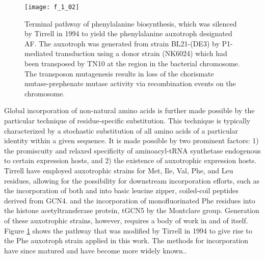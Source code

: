 \begin{refsection}
\begin{figure}[h!] \centering \texttt{[image: f\_1\_02]}
    \caption[Terminal pathway
        of phenylalanine biosynthesis, which was silenced by
        Tirrell  in 1994 to yield the phenylalanine auxotroph
        designated AF. The auxotroph was generated from
         strain BL21-(DE3) by P1-mediated transduction using a
        donor strain (NK6024) which had been transposed by TN10 at the
         region in the bacterial chromosome.  The transposon
        mutagenesis results in loss of the chorismate mutage-prephenate mutase
        activity via recombination events on the
chromosome.]{Terminal pathway
        of phenylalanine biosynthesis,\cite{Im1971} which was silenced by
        Tirrell  in 1994 to yield the phenylalanine auxotroph
        designated AF.\cite{Yoshikawa1994} The auxotroph was generated from
         strain BL21-(DE3) by P1-mediated transduction using a
        donor strain (NK6024) which had been transposed by TN10 at the
         region in the bacterial chromosome.  The transposon
        mutagenesis results in loss of the chorismate mutase-prephenate mutase
        activity via recombination events on the
chromosome.}\label{fig:chorismate_pathway} \end{figure}
Global incorporation of non-natural amino acids is further made possible by the
particular technique of residue-specific substitution. This technique is
typically characterized by a stochastic substitution of all amino acids of a
particular identity within a given sequence. It is made possible by two
prominent factors: 1) the promiscuity and relaxed specificity of aminoacyl-tRNA
synthetase endogenous to certain expression hosts,\cite{Yoder2002} and 2) the
existence of auxotrophic expression hosts.\cite{Link2003,Link2005} Tirrell 
have employed  auxotrophic strains for Met,\cite{Kiick2002}
Ile,\cite{Wang2003a}
Val,\cite{Wang2004}
Phe,\cite{Yoshikawa1994} 
and Leu residues,\cite{Tang2001a}
allowing for the possibility for downstream incorporation efforts,
such as the incorporation of both  and
 into basic leucine zipper, coiled-coil
peptides derived from GCN4.\cite{Son2006} and the incorporation of
monofluorinated Phe residues into the histone acetyltransferase protein,
tGCN5 by the Montclare group.\cite{Voloshchuk2009} 
Generation of these auxotrophic strains, however,
requires a body of work in and of itself.\cite{Yoshikawa1994,Son2006} Figure
\ref{fig:chorismate_pathway} shows the pathway that was modified by Tirrell
 in 1994 to give rise to the Phe auxotroph strain applied in this
work. The methods for incorporation have since matured and have become more
widely known.\cite{Hammill2007}.


\end{refsection}
